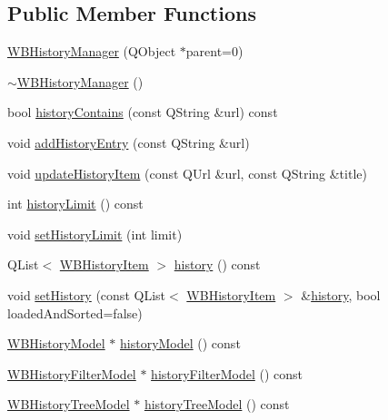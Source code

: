 \subsection*{Public Member Functions}
\begin{DoxyCompactItemize}
\item 
\hyperlink{class_w_b_history_manager_af6e554315a62f73b992821d871eeef5d}{W\-B\-History\-Manager} (Q\-Object $\ast$parent=0)
\item 
\hyperlink{class_w_b_history_manager_ac912f50bf4800fc792baae0d1e8b3e7e}{$\sim$\-W\-B\-History\-Manager} ()
\item 
bool \hyperlink{class_w_b_history_manager_acc7ef1d1cbfd3a31c3f6a106262238e6}{history\-Contains} (const Q\-String \&url) const 
\item 
void \hyperlink{class_w_b_history_manager_ac17f733de040227c0d309299928ef157}{add\-History\-Entry} (const Q\-String \&url)
\item 
void \hyperlink{class_w_b_history_manager_a23ef7e0b61749b3b33591e9ca6413a4a}{update\-History\-Item} (const Q\-Url \&url, const Q\-String \&title)
\item 
int \hyperlink{class_w_b_history_manager_a1b7cfda2a8c886a7b14da5a43940b6c7}{history\-Limit} () const 
\item 
void \hyperlink{class_w_b_history_manager_a73e44c1cb296fdcc42cb7567fe534f90}{set\-History\-Limit} (int limit)
\item 
Q\-List$<$ \hyperlink{class_w_b_history_item}{W\-B\-History\-Item} $>$ \hyperlink{class_w_b_history_manager_ae0f6c3f537992122192559a4f711a60d}{history} () const 
\item 
void \hyperlink{class_w_b_history_manager_ac749e2513aa93549de988bb15781d258}{set\-History} (const Q\-List$<$ \hyperlink{class_w_b_history_item}{W\-B\-History\-Item} $>$ \&\hyperlink{class_w_b_history_manager_ae0f6c3f537992122192559a4f711a60d}{history}, bool loaded\-And\-Sorted=false)
\item 
\hyperlink{class_w_b_history_model}{W\-B\-History\-Model} $\ast$ \hyperlink{class_w_b_history_manager_a9b399152d33e2e38fa6774ebf2e394aa}{history\-Model} () const 
\item 
\hyperlink{class_w_b_history_filter_model}{W\-B\-History\-Filter\-Model} $\ast$ \hyperlink{class_w_b_history_manager_a182cb054df373934f2a90025768bc070}{history\-Filter\-Model} () const 
\item 
\hyperlink{class_w_b_history_tree_model}{W\-B\-History\-Tree\-Model} $\ast$ \hyperlink{class_w_b_history_manager_a2928319fdfb6988be63872b10fdd3e1a}{history\-Tree\-Model} () const 
\end{DoxyCompactItemize}
